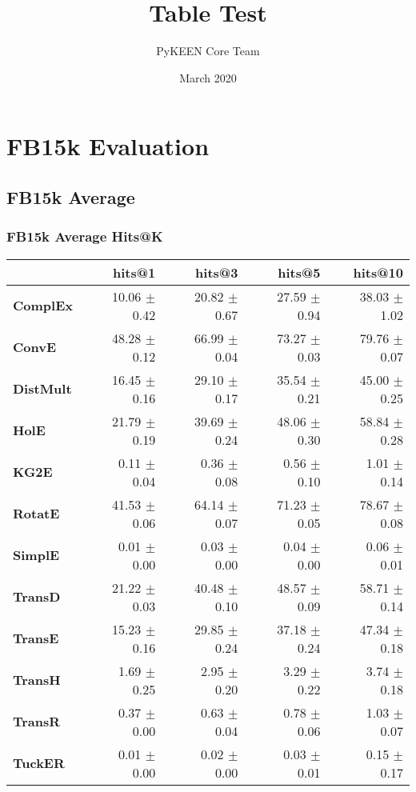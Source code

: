 \documentclass{article}
\title{Table Test}
\author{PyKEEN Core Team}
\date{March 2020}
\begin{document}
\section{FB15k Evaluation}
\subsection{FB15k Average}
\subsubsection{FB15k Average Hits@K}
    \begin{center}
    \begin{tabular}{lrrrr}
\toprule
{} &        hits@1 &        hits@3 &        hits@5 &       hits@10 \\
\midrule
\textbf{ComplEx } &  10.06 $\pm$ 0.42 &  20.82 $\pm$ 0.67 &  27.59 $\pm$ 0.94 &  38.03 $\pm$ 1.02 \\
\textbf{ConvE   } &  48.28 $\pm$ 0.12 &  66.99 $\pm$ 0.04 &  73.27 $\pm$ 0.03 &  79.76 $\pm$ 0.07 \\
\textbf{DistMult} &  16.45 $\pm$ 0.16 &  29.10 $\pm$ 0.17 &  35.54 $\pm$ 0.21 &  45.00 $\pm$ 0.25 \\
\textbf{HolE    } &  21.79 $\pm$ 0.19 &  39.69 $\pm$ 0.24 &  48.06 $\pm$ 0.30 &  58.84 $\pm$ 0.28 \\
\textbf{KG2E    } &  $\phantom{5}$0.11 $\pm$ 0.04 &  $\phantom{5}$0.36 $\pm$ 0.08 &  $\phantom{5}$0.56 $\pm$ 0.10 &  $\phantom{5}$1.01 $\pm$ 0.14 \\
\textbf{RotatE  } &  41.53 $\pm$ 0.06 &  64.14 $\pm$ 0.07 &  71.23 $\pm$ 0.05 &  78.67 $\pm$ 0.08 \\
\textbf{SimplE  } &  $\phantom{5}$0.01 $\pm$ 0.00 &  $\phantom{5}$0.03 $\pm$ 0.00 &  $\phantom{5}$0.04 $\pm$ 0.00 &  $\phantom{5}$0.06 $\pm$ 0.01 \\
\textbf{TransD  } &  21.22 $\pm$ 0.03 &  40.48 $\pm$ 0.10 &  48.57 $\pm$ 0.09 &  58.71 $\pm$ 0.14 \\
\textbf{TransE  } &  15.23 $\pm$ 0.16 &  29.85 $\pm$ 0.24 &  37.18 $\pm$ 0.24 &  47.34 $\pm$ 0.18 \\
\textbf{TransH  } &  $\phantom{5}$1.69 $\pm$ 0.25 &  $\phantom{5}$2.95 $\pm$ 0.20 &  $\phantom{5}$3.29 $\pm$ 0.22 &  $\phantom{5}$3.74 $\pm$ 0.18 \\
\textbf{TransR  } &  $\phantom{5}$0.37 $\pm$ 0.00 &  $\phantom{5}$0.63 $\pm$ 0.04 &  $\phantom{5}$0.78 $\pm$ 0.06 &  $\phantom{5}$1.03 $\pm$ 0.07 \\
\textbf{TuckER  } &  $\phantom{5}$0.01 $\pm$ 0.00 &  $\phantom{5}$0.02 $\pm$ 0.00 &  $\phantom{5}$0.03 $\pm$ 0.01 &  $\phantom{5}$0.15 $\pm$ 0.17 \\
\bottomrule
\end{tabular}

    \end{center}
\end{document}
